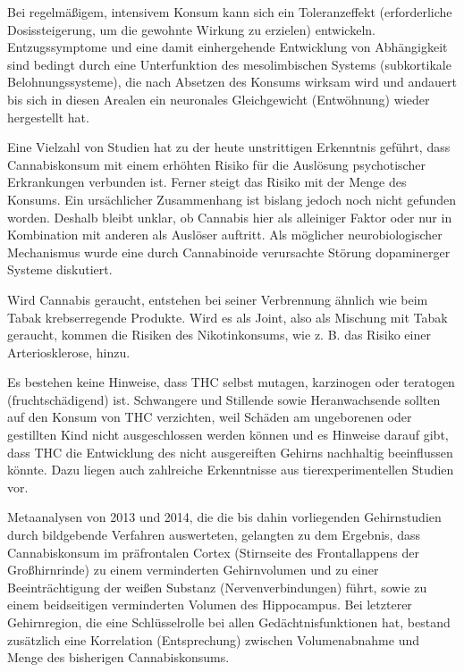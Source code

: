 \documentclass[openany]{scrbook}
\begin{document}
	Bei regelmäßigem, intensivem Konsum kann sich ein Toleranzeffekt (erforderliche Dosissteigerung, um die gewohnte Wirkung zu erzielen) entwickeln. Entzugssymptome und eine damit einhergehende Entwicklung von Abhängigkeit sind bedingt durch eine Unterfunktion des mesolimbischen Systems (subkortikale Belohnungssysteme), die nach Absetzen des Konsums wirksam wird und andauert bis sich in diesen Arealen ein neuronales Gleichgewicht (Entwöhnung) wieder hergestellt hat.
	
	Eine Vielzahl von Studien hat zu der heute unstrittigen Erkenntnis geführt, dass Cannabiskonsum mit einem erhöhten Risiko für die Auslösung psychotischer Erkrankungen verbunden ist. Ferner steigt das Risiko mit der Menge des Konsums. Ein ursächlicher Zusammenhang ist bislang jedoch noch nicht gefunden worden. Deshalb bleibt unklar, ob Cannabis hier als alleiniger Faktor oder nur in Kombination mit anderen als Auslöser auftritt. Als möglicher neurobiologischer Mechanismus wurde eine durch Cannabinoide verursachte Störung dopaminerger Systeme diskutiert.
	
	Wird Cannabis geraucht, entstehen bei seiner Verbrennung ähnlich wie beim Tabak krebserregende Produkte. Wird es als Joint, also als Mischung mit Tabak geraucht, kommen die Risiken des Nikotinkonsums, wie z. B. das Risiko einer Arteriosklerose, hinzu.
	
	Es bestehen keine Hinweise, dass THC selbst mutagen, karzinogen oder teratogen (fruchtschädigend) ist. Schwangere und Stillende sowie Heranwachsende sollten auf den Konsum von THC verzichten, weil Schäden am ungeborenen oder gestillten Kind nicht ausgeschlossen werden können und es Hinweise darauf gibt, dass THC die Entwicklung des nicht ausgereiften Gehirns nachhaltig beeinflussen könnte. Dazu liegen auch zahlreiche Erkenntnisse aus tierexperimentellen Studien vor.
	
	Metaanalysen von 2013 und 2014, die die bis dahin vorliegenden Gehirnstudien durch bildgebende Verfahren auswerteten, gelangten zu dem Ergebnis, dass Cannabiskonsum im präfrontalen Cortex (Stirnseite des Frontallappens der Großhirnrinde) zu einem verminderten Gehirnvolumen und zu einer Beeinträchtigung der weißen Substanz (Nervenverbindungen) führt, sowie zu einem beidseitigen verminderten Volumen des Hippocampus. Bei letzterer Gehirnregion, die eine Schlüsselrolle bei allen Gedächtnisfunktionen hat, bestand zusätzlich eine Korrelation (Entsprechung) zwischen Volumenabnahme und Menge des bisherigen Cannabiskonsums.
	
\newpage

\printbibliography
	
\end{document}
